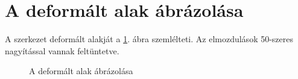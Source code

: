 \section{A deformált alak ábrázolása}

A szerkezet deformált alakját a \ref{fig:deformed}. ábra szemlélteti.
Az elmozdulások 50-szeres nagyítással vannak feltüntetve.

\begin{figure}[H]
  \centering
  \vspace{-5mm}
  
  \vspace{-2mm}
  \caption{A deformált alak ábrázolása}
  \vspace{-5mm}
  \label{fig:deformed}
\end{figure}
